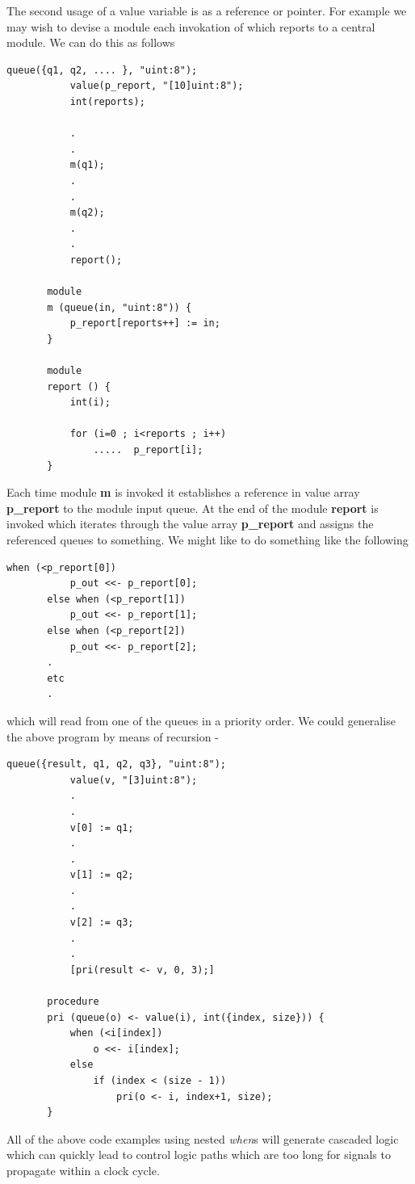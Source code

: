     The second usage of a value variable is as a reference or pointer.
    For example we may wish to devise a module each invokation of which
    reports to a central module. We can do this as follows
    \begin{lstlisting}[gobble=4, language=threepl]
           queue({q1, q2, .... }, "uint:8");
           value(p_report, "[10]uint:8");
           int(reports);

           .
           .
           m(q1);
           .
           .
           m(q2);
           .
           .
           report();

       module
       m (queue(in, "uint:8")) {
           p_report[reports++] := in;
       }

       module
       report () {
           int(i);

           for (i=0 ; i<reports ; i++)
               .....  p_report[i];
       }
    \end{lstlisting}
    Each time module {\bf m} is invoked it establishes a reference
    in value array {\bf p\_report} to the module input queue. At the
    end of the module {\bf report} is invoked which iterates
    through the value array {\bf p\_report} and assigns the referenced
    queues to something. We might like to do something like the following
    \begin{lstlisting}[gobble=4, language=threepl]
       when (<p_report[0])
           p_out <<- p_report[0];
       else when (<p_report[1])
           p_out <<- p_report[1];
       else when (<p_report[2])
           p_out <<- p_report[2];
       .
       etc
       .
    \end{lstlisting}
    which will read from one of the queues in a priority order. We could
    generalise the above program by means of recursion - 
    \begin{lstlisting}[gobble=4, language=threepl]
           queue({result, q1, q2, q3}, "uint:8");
           value(v, "[3]uint:8");
           .
           .
           v[0] := q1;
           .
           .
           v[1] := q2;
           .
           .
           v[2] := q3;
           .
           .
           [pri(result <- v, 0, 3);]

       procedure
       pri (queue(o) <- value(i), int({index, size})) {
           when (<i[index])
               o <<- i[index];
           else
               if (index < (size - 1))
                   pri(o <- i, index+1, size);
       }
    \end{lstlisting}    
    All of the above code examples using nested {\em when}s will generate
    cascaded logic which can quickly lead to control logic paths which are
    too long for signals to propagate within a clock cycle.

